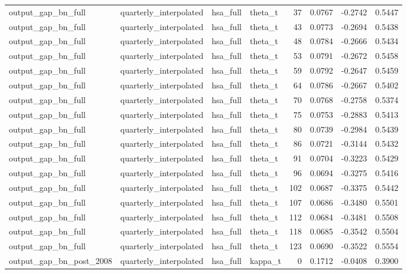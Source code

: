 \begin{tabular}{llllrrrr}
output\_gap\_bn\_full & quarterly\_interpolated & hsa\_full & theta\_t & 37 & 0.0767 & -0.2742 & 0.5447 \\
output\_gap\_bn\_full & quarterly\_interpolated & hsa\_full & theta\_t & 43 & 0.0773 & -0.2694 & 0.5438 \\
output\_gap\_bn\_full & quarterly\_interpolated & hsa\_full & theta\_t & 48 & 0.0784 & -0.2666 & 0.5434 \\
output\_gap\_bn\_full & quarterly\_interpolated & hsa\_full & theta\_t & 53 & 0.0791 & -0.2672 & 0.5458 \\
output\_gap\_bn\_full & quarterly\_interpolated & hsa\_full & theta\_t & 59 & 0.0792 & -0.2647 & 0.5459 \\
output\_gap\_bn\_full & quarterly\_interpolated & hsa\_full & theta\_t & 64 & 0.0786 & -0.2667 & 0.5402 \\
output\_gap\_bn\_full & quarterly\_interpolated & hsa\_full & theta\_t & 70 & 0.0768 & -0.2758 & 0.5374 \\
output\_gap\_bn\_full & quarterly\_interpolated & hsa\_full & theta\_t & 75 & 0.0753 & -0.2883 & 0.5413 \\
output\_gap\_bn\_full & quarterly\_interpolated & hsa\_full & theta\_t & 80 & 0.0739 & -0.2984 & 0.5439 \\
output\_gap\_bn\_full & quarterly\_interpolated & hsa\_full & theta\_t & 86 & 0.0721 & -0.3144 & 0.5432 \\
output\_gap\_bn\_full & quarterly\_interpolated & hsa\_full & theta\_t & 91 & 0.0704 & -0.3223 & 0.5429 \\
output\_gap\_bn\_full & quarterly\_interpolated & hsa\_full & theta\_t & 96 & 0.0694 & -0.3275 & 0.5416 \\
output\_gap\_bn\_full & quarterly\_interpolated & hsa\_full & theta\_t & 102 & 0.0687 & -0.3375 & 0.5442 \\
output\_gap\_bn\_full & quarterly\_interpolated & hsa\_full & theta\_t & 107 & 0.0686 & -0.3480 & 0.5501 \\
output\_gap\_bn\_full & quarterly\_interpolated & hsa\_full & theta\_t & 112 & 0.0684 & -0.3481 & 0.5508 \\
output\_gap\_bn\_full & quarterly\_interpolated & hsa\_full & theta\_t & 118 & 0.0685 & -0.3542 & 0.5504 \\
output\_gap\_bn\_full & quarterly\_interpolated & hsa\_full & theta\_t & 123 & 0.0690 & -0.3522 & 0.5554 \\
output\_gap\_bn\_post\_2008 & quarterly\_interpolated & hsa\_full & kappa\_t & 0 & 0.1712 & -0.0408 & 0.3900 \\

\end{tabular}
